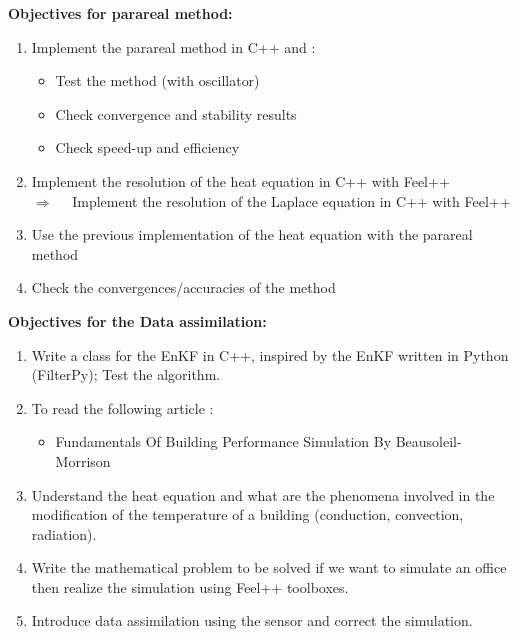 \documentclass[12pt]{article}
\begin{document}
	\noindent \textbf{Objectives for parareal method:}
	\begin{enumerate}
		\item Implement the parareal method in C++ and :
		\begin{itemize}
			\item Test the method (with oscillator)
			\item Check convergence and stability results
			\item Check speed-up and efficiency 
		\end{itemize}
		\item Implement the resolution of the heat equation in C++ with Feel++ \\
		$\Rightarrow \quad $ Implement the resolution of the Laplace equation in C++ with Feel++
		\item Use the previous implementation of the heat equation with the parareal method
		\item Check the convergences/accuracies of the method
	\end{enumerate}
	\newpage
	\noindent \textbf{Objectives for the Data assimilation:}
	\begin{enumerate}
        \item Write a class for the EnKF in C++, inspired by the EnKF written in Python (FilterPy); Test the algorithm.
        \item To read the following article :
        \begin{itemize}
            \item Fundamentals Of Building Performance Simulation By Beausoleil-Morrison
        \end{itemize}
        
    \item Understand the heat equation and what are the phenomena involved in the modification of the temperature of a building (conduction, convection, radiation).
    \item Write the mathematical problem to be solved if we want to simulate an office then realize the simulation using Feel++ toolboxes.
    \item Introduce data assimilation using the sensor and correct the simulation.
    \end{enumerate}

	\newpage
\end{document}
